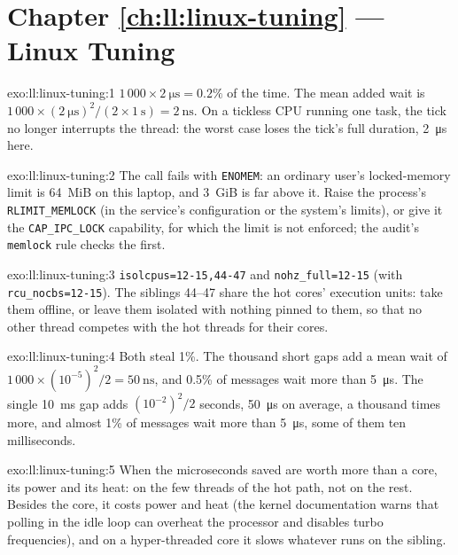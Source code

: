 \section*{Chapter \ref{ch:ll:linux-tuning} --- Linux Tuning}

\begin{solution}{exo:ll:linux-tuning:1}
$1\,000 \times \qty{2}{\micro\second} = 0.2\%$ of the time. The mean added wait is $1\,000 \times (\qty{2}{\micro\second})^2 /
(2 \times \qty{1}{\second}) = \qty{2}{\nano\second}$. On a tickless CPU running one task, the tick no longer interrupts the
thread: the worst case loses the tick's full duration, \qty{2}{\micro\second} here.
\end{solution}

\begin{solution}{exo:ll:linux-tuning:2}
The call fails with \texttt{ENOMEM}: an ordinary user's locked-memory limit is 64~MiB on this laptop, and 3~GiB is far above
it. Raise the process's \texttt{RLIMIT\_MEMLOCK} (in the service's configuration or the system's limits), or give it the
\texttt{CAP\_IPC\_LOCK} capability, for which the limit is not enforced; the audit's \texttt{memlock} rule checks the first.
\end{solution}

\begin{solution}{exo:ll:linux-tuning:3}
\texttt{isolcpus=12-15,44-47} and \texttt{nohz\_full=12-15} (with \texttt{rcu\_nocbs=12-15}). The siblings 44--47 share the
hot cores' execution units: take them offline, or leave them isolated with nothing pinned to them, so that no other thread
competes with the hot threads for their cores.
\end{solution}

\begin{solution}{exo:ll:linux-tuning:4}
Both steal 1\%. The thousand short gaps add a mean wait of $1\,000 \times (10^{-5})^2/2 = \qty{50}{\nano\second}$, and 0.5\%
of messages wait more than \qty{5}{\micro\second}. The single \qty{10}{\milli\second} gap adds $(10^{-2})^2/2$ seconds,
\qty{50}{\micro\second} on average, a thousand times more, and almost 1\% of messages wait more than
\qty{5}{\micro\second}, some of them ten milliseconds.
\end{solution}

\begin{solution}{exo:ll:linux-tuning:5}
When the microseconds saved are worth more than a core, its power and its heat: on the few threads of the hot path, not on
the rest. Besides the core, it costs power and heat (the kernel documentation warns that polling in the idle loop can overheat
the processor and disables turbo frequencies), and on a hyper-threaded core it slows whatever runs on the sibling.
\end{solution}

